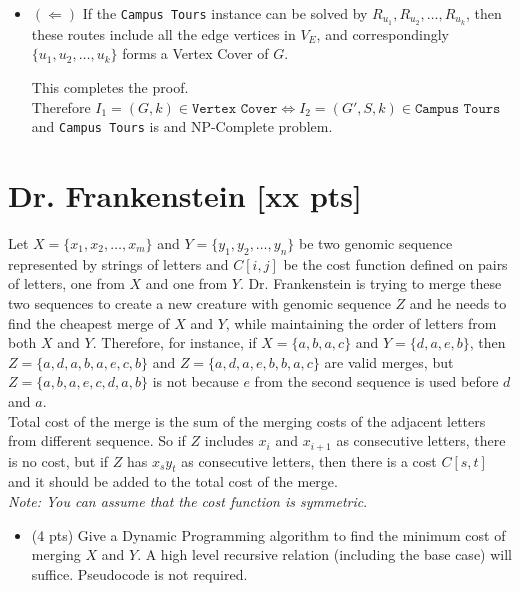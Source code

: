 \documentclass{article}
\begin{document}
\begin{itemize}
\begin{itemize}
		\item$(\Leftarrow)$ If the \texttt{Campus Tours} instance can be solved by $R_{u_1}, R_{u_2}, \ldots, R_{u_k}$, then these routes include all the edge vertices in $V_E$, and correspondingly $\{u_1, u_2, \ldots, u_k\}$ forms a Vertex Cover of $G$.
		
		This completes the proof. \\
		Therefore $I_1 = (G,k) \in \texttt{Vertex Cover} \Leftrightarrow I_2 = (G',S,k) \in \texttt{Campus Tours}$ and \texttt{Campus Tours} is and NP-Complete problem.
		
	\end{itemize}		
\end{itemize}


\color{black}
\newpage
\section{Dr. Frankenstein [xx pts]}  %
Let $X = \{x_1, x_2, \ldots, x_m\}$ and $Y = \{y_1, y_2, \ldots, y_n\}$ be two genomic sequence represented by strings of letters and $C[i,j]$ be the cost function defined on pairs of letters, one from $X$ and one from $Y$. 
Dr. Frankenstein is trying to merge these two sequences to create a new creature with genomic sequence $Z$ and he needs to find the cheapest merge of $X$ and $Y$, while maintaining the order of letters from both $X$ and $Y$. Therefore, for instance, if $X = \{a,b,a,c\}$ and $Y=\{d,a,e,b\}$, then $Z = \{ a,d,a,b,a,e,c,b \}$ and $Z = \{a,d,a,e,b,b,a,c \}$ are valid merges, but $Z=\{a,b,a,e,c,d,a,b\}$ is not because $e$ from the second sequence is used before $d$ and $a$.\\
Total cost of the merge is the sum of the merging costs of the adjacent letters from different sequence. So if $Z$ includes $x_i$ and $x_{i+1}$ as consecutive letters, there is no cost, but if $Z$ has $x_sy_t$ as consecutive letters, then there is a cost $C[s,t]$ and it should be added to the total cost of the merge.\\
\textit{Note: You can assume that the cost function is symmetric}.

\begin{itemize}
	\item[] (4 pts) Give a Dynamic Programming algorithm to find the minimum cost of merging $X$ and $Y$.  A high level recursive relation (including the base case) will suffice. Pseudocode is not required. 
\end{itemize}
\end{document}
